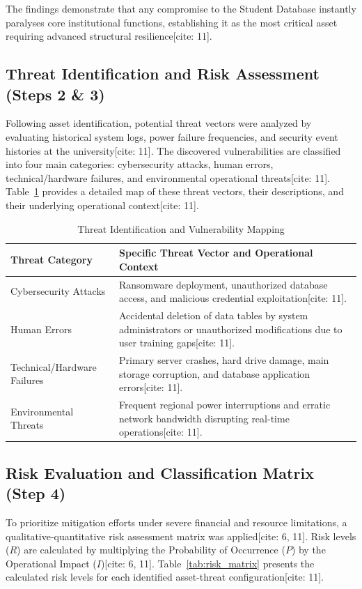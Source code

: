 \documentclass[journal,onecolumn,12pt,twoside]{IEEEtran}
\begin{document}
	The findings demonstrate that any compromise to the Student Database instantly paralyses core institutional functions, establishing it as the most critical asset requiring advanced structural resilience[cite: 11].
	
	\subsection{Threat Identification and Risk Assessment (Steps 2 \& 3)}
	\label{subsec:results_steps2_3}
	Following asset identification, potential threat vectors were analyzed by evaluating historical system logs, power failure frequencies, and security event histories at the university[cite: 11]. The discovered vulnerabilities are classified into four main categories: cybersecurity attacks, human errors, technical/hardware failures, and environmental operational threats[cite: 11]. Table~\ref{tab:threat_mapping} provides a detailed map of these threat vectors, their descriptions, and their underlying operational context[cite: 11].
	
	\begin{table}[htbp]
		\caption{Threat Identification and Vulnerability Mapping}
		\label{tab:threat_mapping}
		\centering
		\begin{tabular}{l p{9cm}}
			\toprule
			\textbf{Threat Category} & \textbf{Specific Threat Vector and Operational Context} \\
			\midrule
			Cybersecurity Attacks & Ransomware deployment, unauthorized database access, and malicious credential exploitation[cite: 11]. \\
			\addlinespace
			Human Errors & Accidental deletion of data tables by system administrators or unauthorized modifications due to user training gaps[cite: 11]. \\
			\addlinespace
			Technical/Hardware Failures & Primary server crashes, hard drive damage, main storage corruption, and database application errors[cite: 11]. \\
			\addlinespace
			Environmental Threats & Frequent regional power interruptions and erratic network bandwidth disrupting real-time operations[cite: 11]. \\
			\bottomrule
		\end{tabular}
	\end{table}
	
	\subsection{Risk Evaluation and Classification Matrix (Step 4)}
	\label{subsec:results_step4}
	To prioritize mitigation efforts under severe financial and resource limitations, a qualitative-quantitative risk assessment matrix was applied[cite: 6, 11]. Risk levels ($R$) are calculated by multiplying the Probability of Occurrence ($P$) by the Operational Impact ($I$)[cite: 6, 11]. Table~\ref{tab:risk_matrix} presents the calculated risk levels for each identified asset-threat configuration[cite: 11].
	
\end{document}

